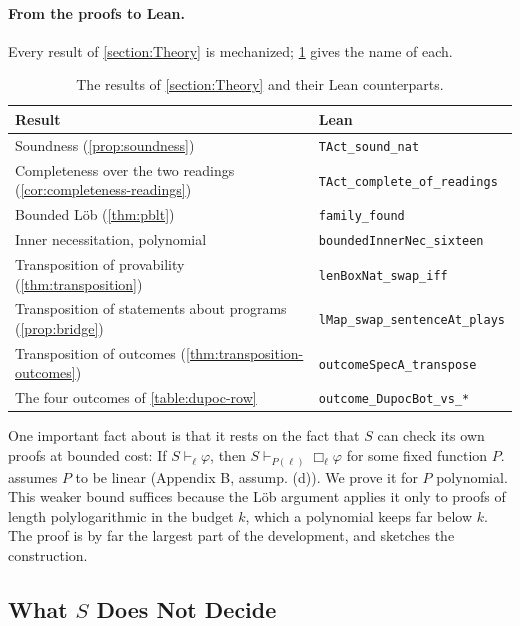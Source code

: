 \documentclass[twoside,11pt]{article}
\begin{document}
\paragraph{From the proofs to Lean.} Every result of \cref{section:Theory} is mechanized; \cref{table:lean-names} gives the name of each.

\begin{table}[h]\centering\small
\begin{tabular}{ll}\toprule
Result & Lean \\\midrule
Soundness (\cref{prop:soundness}) & \texttt{TAct\_sound\_nat} \\
Completeness over the two readings (\cref{cor:completeness-readings}) & \texttt{TAct\_complete\_of\_readings} \\
Bounded L\"ob (\cref{thm:pblt}) & \texttt{family\_found} \\
Inner necessitation, polynomial & \texttt{boundedInnerNec\_sixteen} \\
Transposition of provability (\cref{thm:transposition}) & \texttt{lenBoxNat\_swap\_iff} \\
Transposition of statements about programs (\cref{prop:bridge}) & \texttt{lMap\_swap\_sentenceAt\_plays} \\
Transposition of outcomes (\cref{thm:transposition-outcomes}) & \texttt{outcomeSpecA\_transpose} \\
The four outcomes of \cref{table:dupoc-row} & \texttt{outcome\_DupocBot\_vs\_*} \\\bottomrule
\end{tabular}
\caption{The results of \cref{section:Theory} and their Lean counterparts.}
\label{table:lean-names}
\end{table}

One important fact about  is that it rests on the fact that $S$ can check its own proofs at bounded cost: If $S \vdash_\ell \varphi$, then $S \vdash_{P(\ell)}\Box_\ell\varphi$ for some fixed function $P$. \citet{Critch} assumes $P$ to be linear (Appendix B, assump. (d)). We prove it for $P$ polynomial. This weaker bound suffices because the L\"ob argument applies it only to proofs of length polylogarithmic in the budget $k$, which a polynomial keeps far below $k$. The proof is by far the largest part of the development, and  sketches the construction.


\subsection{What $S$ Does Not Decide}
\label{subsection:Lean-Floors}
\end{document}
